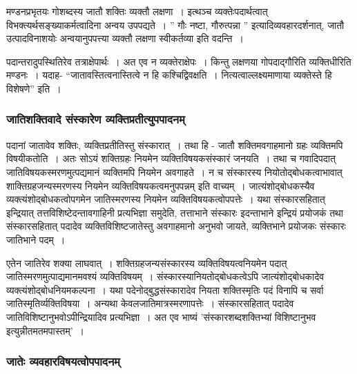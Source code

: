 				मण्डनप्रभृतयः गोशब्दस्य जातौ शक्तिः व्यक्तौ लक्षणा~। इत्थञ्च व्यक्तेःपदार्थत्वात् विभक्त्यर्थसङ्ख्याकर्मत्वादिना अन्वय उपपद्यते~। ” गौः नष्टा, गौरुत्पन्ना ” इत्यादिव्यवहारदर्शनात्, जातौ उत्पादविनाशयोः अन्वयानुपपत्त्या व्यक्तौ लक्षणा स्वीकर्तव्या इति वदन्ति~। 

				\begin{small}

					पदान्तरादुपस्थितिरेव तत्राक्षेपार्थः~। अत एव न व्यक्तेराक्षेपः~। किन्तु लक्षणया गोपदाद्गौरिति व्यक्तिधीरिति मण्डनः~। यदाह- “जातावस्तित्वनास्तित्वे न हि कश्चिद्विवक्षति~। नित्यत्वाल्लक्ष्यमाणाया व्यक्तेस्ते हि विशेषणे” इति~। 
	
				\end{small}

			\subsubsection{जातिशक्तिवादे संस्कारेण व्यक्तिप्रतीत्युपपादनम्}

				पदानां जातावेव शक्तिः, व्यक्तिप्रतीतिस्तु संस्कारात्~। तथा हि - जातौ शक्तिमवगाहमानो ग्रहः व्यक्तिमपि विषयीकतोति~। अतः सोऽयं शक्तिग्रहः नियमेन व्यक्तिविषयकसंस्कारं जनयति~। तथा च गवादिपदात् जातिविषयकस्मरणमुत्पद्यमानं व्यक्तिमपि नियमेन अवगाहते~। न च संस्कारस्य नियोतोद्बोधकत्वाभावात् शाक्तिग्रहजन्यस्मरणस्य नियमेन व्यक्तिविषयकत्वमनुपपन्नम् इति वाच्यम्~। जात्यंशोद्बोधकस्यैव व्यक्त्यंशोद्बोधकत्वोपगमेन जातिस्मरणस्य नियमेन व्यक्तिविषयकत्वोपपत्तेः~। यथा संस्कारसहितात् इन्द्रियात् तत्तविशिष्टेदन्तावगाहिनी प्रत्यभिज्ञा समुदेति, तत्ताभाने संस्कारः इदन्ताभाने इन्द्रियं प्रयोजकं तथा संस्कारसहितात् पदादेव व्यक्तिविशिष्टजातेस्तु अवगाहमानो अनुभवो जायते, व्यक्तिभाने प्रयोजकः संस्कारः जातिभाने पदम्~।

				\begin{small}

					एतेन जातिरेव शक्या लाघवात्~। शक्तिग्रहजन्यसंस्कारस्य व्यक्तिविषयत्वनियमेन पदात् जातिस्मरणमुत्पाद्यमानमवश्यं व्यक्तिविषयम्~। संस्कारस्यानियतोद्बोधकत्वेऽपि जात्यंशोद्बोधकादेव व्यक्त्यंशोद्बोधनियमकल्पना~। यथा पदेनोद्बुद्धसंस्कारादेव नियता शक्तिस्मृतिः पदं विनापि च सर्वा जातिस्मृतिर्व्यक्तिविषया~। अन्यथा केवलजातिमात्रस्मरणापत्तेः~। संस्कारसहितात् पदादेव जातिविशिष्टानुभवोऽपीन्द्रियादिव प्रत्यभिज्ञा~। अत एव भाष्यं ’संस्कारशब्दशक्तिभ्यां विशिष्टानुभव इत्युन्नीतमतमपास्तम्’~। 
				\end{small}

			\subsubsection{जातेः व्यवहारविषयत्वोपपादनम्}
			
